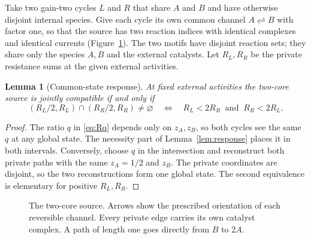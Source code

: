 \documentclass[11pt,a4paper]{article}
\theoremstyle{plain}
\newtheorem{lemma}[theorem]{Lemma}
\theoremstyle{definition}
\theoremstyle{remark}
\newcommand{\rev}{\rightleftharpoons}
\begin{document}
Take two gain-two cycles $L$ and $R$ that share $A$ and $B$ and have otherwise disjoint internal species. Give each cycle its own common channel $A\rev B$ with factor one, so that the source has two reaction indices with identical complexes and identical currents (Figure~\ref{fig:source}). The two motifs have disjoint reaction sets; they share only the species $A,B$ and the external catalysts. Let $R_L,R_R$ be the private resistance sums at the given external activities.

\begin{lemma}[Common-state response]\label{lem:overlap}
At fixed external activities the two-core source is jointly compatible if and only if
\begin{equation}\label{eq:overlap}
 (R_L/2,R_L)\cap(R_R/2,R_R)\ne\varnothing\quad\Longleftrightarrow\quad R_L<2R_R\ \text{ and }\ R_R<2R_L .
\end{equation}
\end{lemma}

\begin{proof}
The ratio $q$ in \eqref{eq:Rq} depends only on $z_A,z_B$, so both cycles see the same $q$ at any global state. The necessity part of Lemma~\ref{lem:response} places it in both intervals. Conversely, choose $q$ in the intersection and reconstruct both private paths with the same $z_A=1/2$ and $z_B$. The private coordinates are disjoint, so the two reconstructions form one global state. The second equivalence is elementary for positive $R_L,R_R$.
\end{proof}

\begin{figure}[t]
\centering
{}
\caption{The two-core source. Arrows show the prescribed orientation of each reversible channel. Every private edge carries its own catalyst complex. A path of length one goes directly from $B$ to $2A$.}
\label{fig:source}
\end{figure}
\end{document}
